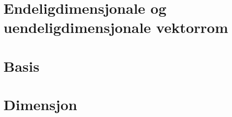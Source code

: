 \section*{Endeligdimensjonale og uendeligdimensjonale vektorrom}

\begin{defn}
\end{defn}




\section*{Basis}













\section*{Dimensjon}








\kapittelslutt
